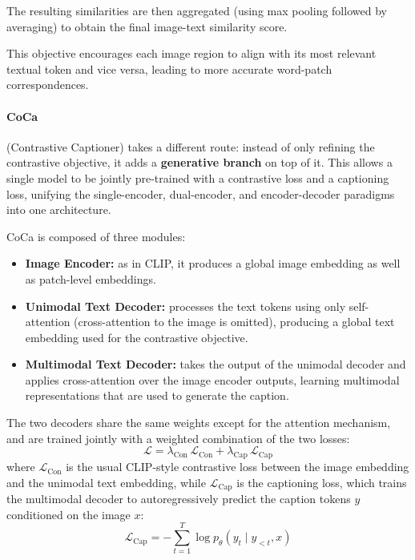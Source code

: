 The resulting similarities are then aggregated (using max pooling followed by averaging) to obtain the final image-text similarity score.

This objective encourages each image region to align with its most relevant textual token and vice versa,
leading to more accurate word-patch correspondences.

\paragraph{CoCa} (Contrastive Captioner) takes a different route: instead of only refining the contrastive objective, it adds a \textbf{generative branch} on top of it.
This allows a single model to be jointly pre-trained with a contrastive loss and a captioning loss, unifying the single-encoder, dual-encoder, and encoder-decoder paradigms into one architecture.

CoCa is composed of three modules:
\begin{itemize}
    \item \textbf{Image Encoder:} as in CLIP, it produces a global image embedding as well as patch-level embeddings.
    \item \textbf{Unimodal Text Decoder:} processes the text tokens using only self-attention (cross-attention to the image is omitted), producing a global text embedding used for the contrastive objective.
    \item \textbf{Multimodal Text Decoder:} takes the output of the unimodal decoder and applies cross-attention over the image encoder outputs, learning multimodal representations that are used to generate the caption.
\end{itemize}

The two decoders share the same weights except for the attention mechanism, and are trained jointly with a weighted combination of the two losses:
\[
    \mathcal{L} = \lambda_{\text{Con}} \, \mathcal{L}_{\text{Con}} + \lambda_{\text{Cap}} \, \mathcal{L}_{\text{Cap}}
\]
where $\mathcal{L}_{\text{Con}}$ is the usual CLIP-style contrastive loss between the image embedding and the unimodal text embedding, while $\mathcal{L}_{\text{Cap}}$ is the captioning loss, which trains the multimodal decoder to autoregressively predict the caption tokens $y$ conditioned on the image $x$:
\[
    \mathcal{L}_{\text{Cap}} = - \sum_{t=1}^{T} \log p_\theta(y_t \mid y_{<t}, x)
\]

